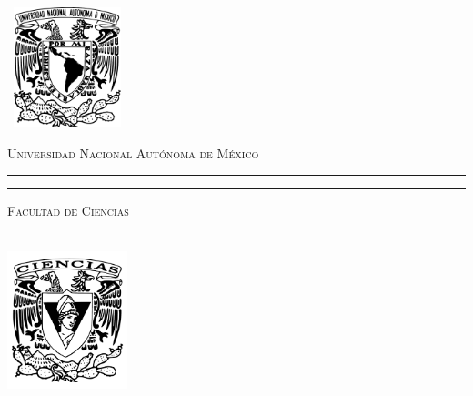 \documentclass[8pt,leqno,pdflatex,spanish]{book}
\theoremstyle{plain}
\theoremstyle{definition}
\theoremstyle{remark}
\begin{document}

\begin{titlepage}
\thispagestyle{empty}
\begin{minipage}[c][0.17\textheight][c]{0.25\textwidth}
\begin{center}
\includegraphics[width=3.5cm, height=3.5cm]{Escudo-UNAM.pdf}
\end{center}
\end{minipage}
\begin{minipage}[c][0.195\textheight][t]{0.75\textwidth}
\begin{center}
\vspace{0.3cm}
\textsc{\large Universidad Nacional Aut\'onoma de M\'exico}\\[0.5cm]
\vspace{0.3cm}
\hrule height2.5pt
\vspace{.2cm}
\hrule height1pt
\vspace{.8cm}
\textsc{Facultad de Ciencias}\\[0.5cm] %
\end{center}
\end{minipage}

\begin{minipage}[c][0.81\textheight][t]{0.25\textwidth}
\vspace*{5mm}
\begin{center}
\hskip2.0mm
\vrule width1pt height13cm 
\vspace{5mm}
\hskip2pt
\vrule width2.5pt height13cm
\hskip2pt
\vrule width1pt height13cm \\
\vspace{5mm}
\includegraphics[height=4.0cm]{Escudo-FCIENCIAS.pdf}
\end{center}
\end{minipage}
\begin{minipage}[c][0.81\textheight][t]{0.75\textwidth}
\begin{center}
\vspace{1cm}


\end{center}
\end{minipage}
\end{titlepage}
\end{document}

